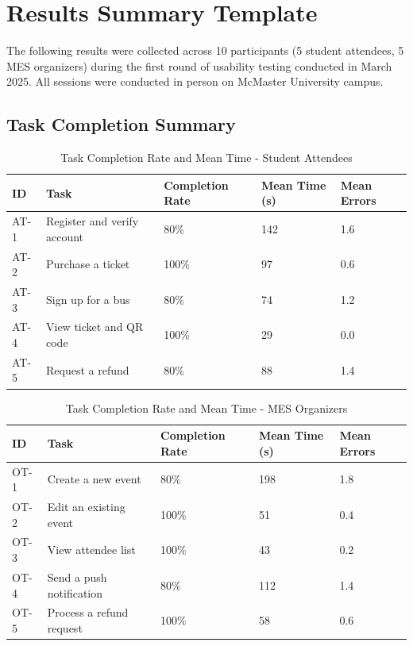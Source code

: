 \documentclass[12pt, titlepage]{article}
\begin{document}
\section{Results Summary Template}


The following results were collected across 10 participants (5 student attendees, 5 MES organizers) during the first round of usability testing conducted in March 2025. All sessions were conducted in person on McMaster University campus.


\subsection{Task Completion Summary}


\begin{table}[H]
\centering
\caption{Task Completion Rate and Mean Time - Student Attendees}
\begin{tabularx}{\textwidth}{p{1cm}p{4.5cm}p{3cm}p{3cm}p{2.5cm}}
\toprule
\textbf{ID} & \textbf{Task} & \textbf{Completion Rate} & \textbf{Mean Time (s)} & \textbf{Mean Errors} \\
\midrule
AT-1 & Register and verify account & 80\% & 142 & 1.6 \\
AT-2 & Purchase a ticket & 100\% & 97 & 0.6 \\
AT-3 & Sign up for a bus & 80\% & 74 & 1.2 \\
AT-4 & View ticket and QR code & 100\% & 29 & 0.0 \\
AT-5 & Request a refund & 80\% & 88 & 1.4 \\
\bottomrule
\end{tabularx}
\end{table}


\begin{table}[H]
\centering
\caption{Task Completion Rate and Mean Time - MES Organizers}
\begin{tabularx}{\textwidth}{p{1cm}p{4.5cm}p{3cm}p{3cm}p{2.5cm}}
\toprule
\textbf{ID} & \textbf{Task} & \textbf{Completion Rate} & \textbf{Mean Time (s)} & \textbf{Mean Errors} \\
\midrule
OT-1 & Create a new event & 80\% & 198 & 1.8 \\
OT-2 & Edit an existing event & 100\% & 51 & 0.4 \\
OT-3 & View attendee list & 100\% & 43 & 0.2 \\
OT-4 & Send a push notification & 80\% & 112 & 1.4 \\
OT-5 & Process a refund request & 100\% & 58 & 0.6 \\
\bottomrule
\end{tabularx}
\end{table}
\end{document}
